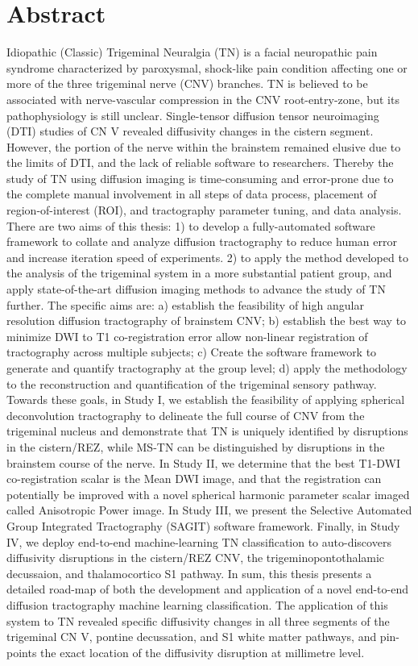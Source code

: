 \chapter{Abstract}
\doublespacing
Idiopathic (Classic) Trigeminal Neuralgia (TN) is a facial neuropathic pain syndrome characterized by paroxysmal, shock-like pain condition affecting one or more of the three trigeminal nerve (CNV) branches. TN is believed to be associated with nerve-vascular compression in the CNV root-entry-zone, but its pathophysiology is still unclear. Single-tensor diffusion tensor neuroimaging (DTI) studies of CN V revealed diffusivity changes in the cistern segment. However, the portion of the nerve within the brainstem remained elusive due to the limits of DTI, and the lack of reliable software to researchers. Thereby the study of TN using diffusion imaging is time-consuming and error-prone due to the complete manual involvement in all steps of data process, placement of region-of-interest (ROI), and tractography parameter tuning, and data analysis. 
There are two aims of this thesis: 1) to develop a fully-automated software framework to collate and analyze diffusion tractography to reduce human error and increase iteration speed of experiments. 2) to apply the method developed to the analysis of the trigeminal system in a more substantial patient group, and apply state-of-the-art diffusion imaging methods to advance the study of TN further. 
The specific aims are: a) establish the feasibility of high angular resolution diffusion tractography of brainstem CNV; b) establish the best way to minimize DWI to T1 co-registration error allow non-linear registration of tractography across multiple subjects; c) Create the software framework to generate and quantify tractography at the group level; d) apply the methodology to the reconstruction and quantification of the trigeminal sensory pathway. 
Towards these goals, in Study I, we establish the feasibility of applying spherical deconvolution tractography to delineate the full course of CNV from the trigeminal nucleus and demonstrate that TN is uniquely identified by disruptions in the cistern/REZ, while MS-TN can be distinguished by disruptions in the brainstem course of the nerve. In Study II, we determine that the best T1-DWI co-registration scalar is the Mean DWI image, and that the registration can potentially be improved with a novel spherical harmonic parameter scalar imaged called Anisotropic Power image. In Study III, we present the Selective Automated Group Integrated Tractography (SAGIT) software framework. Finally, in Study IV, we deploy end-to-end machine-learning TN classification to auto-discovers diffusivity disruptions in the cistern/REZ CNV, the trigeminopontothalamic decussaion, and thalamocortico S1 pathway. 
In sum, this thesis presents a detailed road-map of both the development and application of a novel end-to-end diffusion tractography machine learning classification. The application of this system to TN revealed specific diffusivity changes in all three segments of the trigeminal CN V, pontine decussation, and S1  white matter pathways, and pin-points the exact location of the diffusivity disruption at millimetre level.
